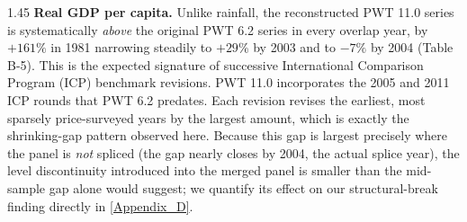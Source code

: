 \documentclass[12pt]{article}
\begin{document}
\begin{bibunit}[jpe]
\begin{spacing}{1.45}
\textbf{Real GDP per capita.} Unlike rainfall, the reconstructed PWT 11.0 series is systematically \emph{above} the original PWT 6.2 series in every overlap year, by $+161\%$ in 1981 narrowing steadily to $+29\%$ by 2003 and to $-7\%$ by 2004 (Table B-5). This is the expected signature of successive International Comparison Program (ICP) benchmark revisions. PWT 11.0 incorporates the 2005 and 2011 ICP rounds that PWT 6.2 predates. Each revision revises the earliest, most sparsely price-surveyed years by the largest amount, which is exactly the shrinking-gap pattern observed here. Because this gap is largest precisely where the panel is \emph{not} spliced (the gap nearly closes by 2004, the actual splice year), the level discontinuity introduced into the merged panel is smaller than the mid-sample gap alone would suggest; we quantify its effect on our structural-break finding directly in \ref{Appendix_D}.


\end{spacing}
\end{bibunit}
\end{document}
